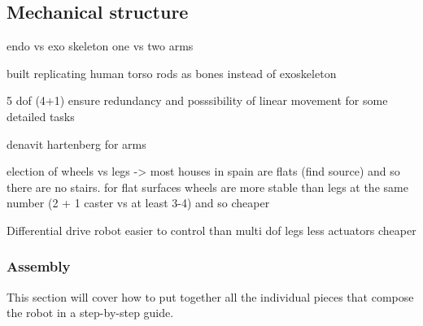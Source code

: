 \subsection{Mechanical structure}

endo vs exo skeleton
one vs two arms



built replicating human torso rods as bones instead of exoskeleton

5 dof (4+1) ensure redundancy and posssibility of linear movement for some detailed tasks

denavit hartenberg for arms

election of wheels vs legs -> most houses in spain are flats (find source) and so there are no stairs. for flat surfaces wheels are more stable than legs at the same number (2 + 1 caster vs at least 3-4) and so cheaper

Differential drive robot easier to control than multi dof legs  less actuators  cheaper






















































\newpage
\subsubsection{Assembly}
This section will cover how to put together all the individual pieces that compose the robot in a step-by-step guide.\\


